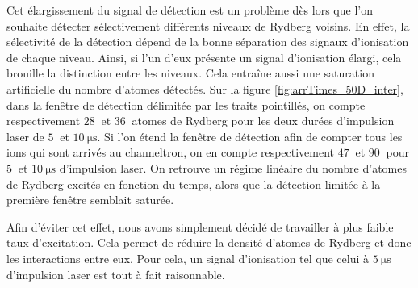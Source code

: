 %
Cet élargissement du signal de détection est un problème dès lors que l'on souhaite détecter sélectivement différents niveaux de Rydberg voisins.
En effet, la sélectivité de la détection dépend de la bonne séparation des signaux d'ionisation de chaque niveau.
Ainsi, si l'un d'eux présente un signal d'ionisation élargi, cela brouille la distinction entre les niveaux.
Cela entraîne aussi une saturation artificielle du nombre d'atomes détectés.
Sur la figure \eqref{fig:arrTimes_50D_inter}, dans la fenêtre de détection délimitée par les traits pointillés, on compte respectivement $\SI{28}{}$ et $\SI{36}{}$ atomes de Rydberg pour les deux durées d'impulsion laser de $\SI{5}{}$ et $\SI{10}{\us}$.
Si l'on étend la fenêtre de détection afin de compter tous les ions qui sont arrivés au channeltron, on en compte respectivement $\SI{47}{}$ et $\SI{90}{}$ pour $\SI{5}{}$ et $\SI{10}{\us}$ d'impulsion laser.
On retrouve un régime linéaire du nombre d'atomes de Rydberg excités en fonction du temps, alors que la détection limitée à la première fenêtre semblait saturée.

Afin d'éviter cet effet, nous avons simplement décidé de travailler à plus faible taux d'excitation.
Cela permet de réduire la densité d'atomes de Rydberg et donc les interactions entre eux.
Pour cela, un signal d'ionisation tel que celui à $\SI{5}{\us}$ d'impulsion laser est tout à fait raisonnable.

		
